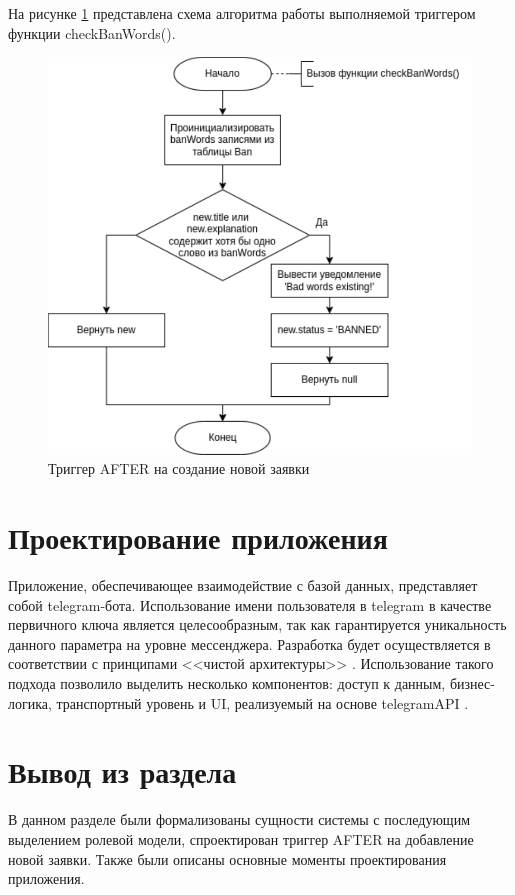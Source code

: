 На рисунке \ref{trigger} представлена схема алгоритма работы выполняемой триггером функции checkBanWords().

\begin{figure}[H]
	\begin{center}
		\includegraphics[page=1,scale=0.8]{assets/trigger.pdf}
	\end{center}
	\caption{Триггер AFTER на создание новой заявки}
	\label{trigger}
\end{figure}

\section{Проектирование приложения}

Приложение, обеспечивающее взаимодействие с базой данных, представляет собой telegram-бота. Использование имени пользователя в telegram в качестве первичного ключа является целесообразным, так как гарантируется уникальность данного параметра на уровне мессенджера. Разработка будет осуществляется в соответствии с принципами <<чистой архитектуры>> \cite{clear_code}. Использование такого подхода позволило выделить несколько компонентов: доступ к данным, бизнес-логика, транспортный уровень и  UI, реализуемый на основе telegramAPI \cite{telegram_api}. 

\section{Вывод из раздела}

В данном разделе были формализованы сущности системы с последующим выделением ролевой модели, спроектирован триггер AFTER на добавление новой заявки. Также были описаны основные моменты проектирования приложения.